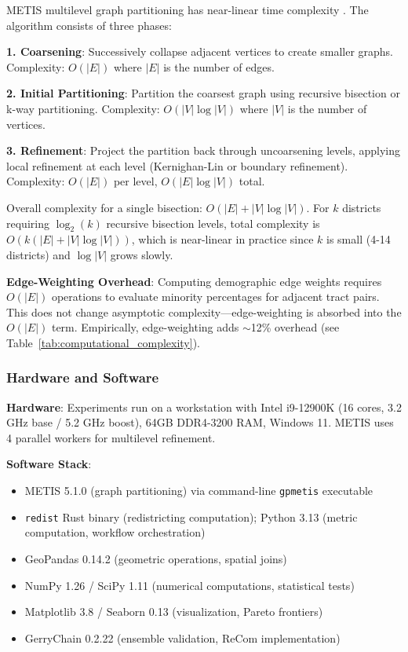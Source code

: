 METIS multilevel graph partitioning has near-linear time complexity \citep{karypis1998}. The algorithm consists of three phases:

\textbf{1. Coarsening}: Successively collapse adjacent vertices to create smaller graphs. Complexity: $O(|E|)$ where $|E|$ is the number of edges.

\textbf{2. Initial Partitioning}: Partition the coarsest graph using recursive bisection or k-way partitioning. Complexity: $O(|V|\log|V|)$ where $|V|$ is the number of vertices.

\textbf{3. Refinement}: Project the partition back through uncoarsening levels, applying local refinement at each level (Kernighan-Lin or boundary refinement). Complexity: $O(|E|)$ per level, $O(|E|\log|V|)$ total.

Overall complexity for a single bisection: $O(|E| + |V|\log|V|)$. For $k$ districts requiring $\log_2(k)$ recursive bisection levels, total complexity is $O(k(|E| + |V|\log|V|))$, which is near-linear in practice since $k$ is small (4-14 districts) and $\log|V|$ grows slowly.

\textbf{Edge-Weighting Overhead}: Computing demographic edge weights requires $O(|E|)$ operations to evaluate minority percentages for adjacent tract pairs. This does not change asymptotic complexity---edge-weighting is absorbed into the $O(|E|)$ term. Empirically, edge-weighting adds $\sim$12\% overhead (see Table~\ref{tab:computational_complexity}).

\subsubsection{Hardware and Software}

\textbf{Hardware}: Experiments run on a workstation with Intel i9-12900K (16 cores, 3.2 GHz base / 5.2 GHz boost), 64GB DDR4-3200 RAM, Windows 11. METIS uses 4 parallel workers for multilevel refinement.

\textbf{Software Stack}:
\begin{itemize}
    \item METIS 5.1.0 (graph partitioning) via command-line \texttt{gpmetis} executable
    \item \texttt{redist} Rust binary (redistricting computation); Python 3.13 (metric computation, workflow orchestration)
    \item GeoPandas 0.14.2 (geometric operations, spatial joins)
    \item NumPy 1.26 / SciPy 1.11 (numerical computations, statistical tests)
    \item Matplotlib 3.8 / Seaborn 0.13 (visualization, Pareto frontiers)
    \item GerryChain 0.2.22 (ensemble validation, ReCom implementation)
\end{itemize}

